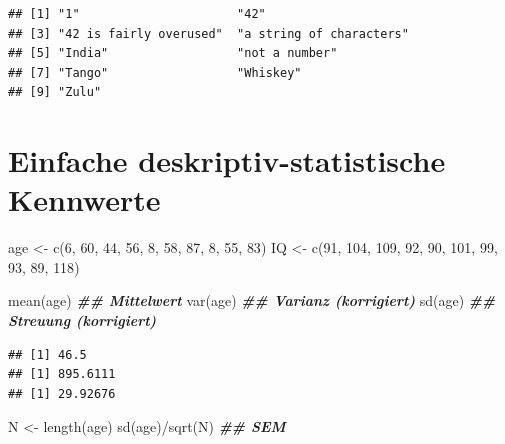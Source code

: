 \documentclass[
]{book}
\newenvironment{Shaded}{\begin{snugshade}}{\end{snugshade}}
\newcommand{\DecValTok}[1]{\textcolor[rgb]{0.00,0.00,0.81}{#1}}
\newcommand{\DocumentationTok}[1]{\textcolor[rgb]{0.56,0.35,0.01}{\textbf{\textit{#1}}}}
\newcommand{\FunctionTok}[1]{\textcolor[rgb]{0.00,0.00,0.00}{#1}}
\newcommand{\NormalTok}[1]{#1}
\newcommand{\OtherTok}[1]{\textcolor[rgb]{0.56,0.35,0.01}{#1}}
\newcommand{\SpecialCharTok}[1]{\textcolor[rgb]{0.00,0.00,0.00}{#1}}
\begin{document}
\begin{verbatim}
## [1] "1"                      "42"                    
## [3] "42 is fairly overused"  "a string of characters"
## [5] "India"                  "not a number"          
## [7] "Tango"                  "Whiskey"               
## [9] "Zulu"
\end{verbatim}

\hypertarget{einfache-deskriptiv-statistische-kennwerte}{%
\section{Einfache deskriptiv-statistische Kennwerte}\label{einfache-deskriptiv-statistische-kennwerte}}

\begin{Shaded}
\begin{Highlighting}[]
\NormalTok{age }\OtherTok{\textless{}{-}} \FunctionTok{c}\NormalTok{(}\DecValTok{6}\NormalTok{, }\DecValTok{60}\NormalTok{, }\DecValTok{44}\NormalTok{, }\DecValTok{56}\NormalTok{, }\DecValTok{8}\NormalTok{, }\DecValTok{58}\NormalTok{, }\DecValTok{87}\NormalTok{, }\DecValTok{8}\NormalTok{, }\DecValTok{55}\NormalTok{, }\DecValTok{83}\NormalTok{)}
\NormalTok{IQ }\OtherTok{\textless{}{-}} \FunctionTok{c}\NormalTok{(}\DecValTok{91}\NormalTok{, }\DecValTok{104}\NormalTok{, }\DecValTok{109}\NormalTok{, }\DecValTok{92}\NormalTok{, }\DecValTok{90}\NormalTok{, }\DecValTok{101}\NormalTok{, }\DecValTok{99}\NormalTok{, }\DecValTok{93}\NormalTok{, }\DecValTok{89}\NormalTok{, }\DecValTok{118}\NormalTok{)}

\FunctionTok{mean}\NormalTok{(age)  }\DocumentationTok{\#\# Mittelwert}
\FunctionTok{var}\NormalTok{(age)  }\DocumentationTok{\#\# Varianz (korrigiert)}
\FunctionTok{sd}\NormalTok{(age) }\DocumentationTok{\#\# Streuung (korrigiert)}
\end{Highlighting}
\end{Shaded}

\begin{verbatim}
## [1] 46.5
## [1] 895.6111
## [1] 29.92676
\end{verbatim}

\begin{Shaded}
\begin{Highlighting}[]
\NormalTok{N }\OtherTok{\textless{}{-}} \FunctionTok{length}\NormalTok{(age)}
\FunctionTok{sd}\NormalTok{(age)}\SpecialCharTok{/}\FunctionTok{sqrt}\NormalTok{(N) }\DocumentationTok{\#\# SEM}
\end{Highlighting}
\end{Shaded}
\end{document}
